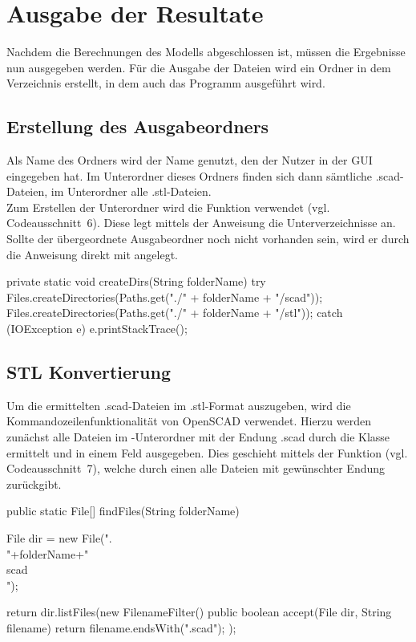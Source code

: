 \section{Ausgabe der Resultate}
Nachdem die Berechnungen des Modells abgeschlossen ist, müssen die Ergebnisse nun ausgegeben werden.
Für die Ausgabe der Dateien wird ein Ordner in dem Verzeichnis erstellt, in dem auch das Programm ausgeführt wird.

\subsection{Erstellung des Ausgabeordners}
Als Name des Ordners wird der Name genutzt, den der Nutzer in der GUI eingegeben hat.
Im Unterordner  dieses Ordners finden sich dann sämtliche .scad-Dateien, im Unterordner  alle .stl-Dateien. \\
Zum Erstellen der Unterordner wird die Funktion  verwendet (vgl. Codeausschnitt~6).
Diese legt mittels der Anweisung  die Unterverzeichnisse an.
Sollte der übergeordnete Ausgabeordner noch nicht vorhanden sein, wird er durch die Anweisung direkt mit angelegt. \\
 
\begin{code}
	private static void createDirs(String folderName) {
		try {
			Files.createDirectories(Paths.get("./" + folderName + "/scad"));
			Files.createDirectories(Paths.get("./" + folderName + "/stl"));
		} catch (IOException e) {
			e.printStackTrace();
		}
	}
\end{code}

\subsection{STL Konvertierung}
Um die ermittelten .scad-Dateien im .stl-Format auszugeben, wird die Kommandozeilenfunktionalität von OpenSCAD verwendet.
Hierzu werden zunächst alle Dateien im -Unterordner mit der Endung .scad durch die Klasse  ermittelt und in einem Feld ausgegeben.
Dies geschieht mittels der Funktion  (vgl. Codeausschnitt~7), welche durch einen  alle Dateien mit gewünschter Endung zurückgibt. \\

\begin{code}
	public static File[] findFiles(String folderName){
		File dir = new File(".\\"+folderName+"\\scad\\");
		
		return dir.listFiles(new FilenameFilter() { 
			public boolean accept(File dir, String filename)
			{ return filename.endsWith(".scad"); }
		});
	}
\end{code}

